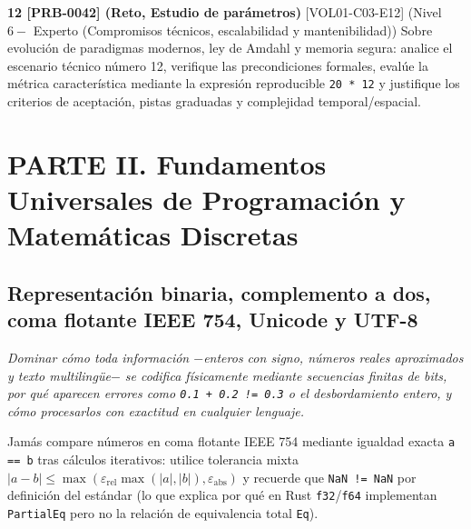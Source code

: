 \documentclass{book}
\begin{document}
\begin{tcolorbox}[title={Ejercicios}, studiumworked, breakable]
\noindent\textbf{12 [PRB-0042] (Reto, Estudio de parámetros)}
[VOL01-C03-E12] (Nivel \(6 -\) Experto (Compromisos técnicos, escalabilidad y mantenibilidad)) Sobre evolución de paradigmas modernos, ley de Amdahl y memoria segura: analice el escenario técnico número 12, verifique las precondiciones formales, evalúe la métrica característica mediante la expresión reproducible \texttt{20 * 12} y justifique los criterios de aceptación, pistas graduadas y complejidad temporal/espacial.
\end{tcolorbox}

\part{PARTE II. Fundamentos Universales de Programación y Matemáticas Discretas}

\chapter{Representación binaria, complemento a dos, coma flotante IEEE 754, Unicode y UTF-8}
\label{chap:cap04-representacion-binaria-ieee754-utf8}

\noindent\textit{Dominar cómo toda información \(-\)enteros con signo, números reales aproximados y texto multilingüe\(-\) se codifica físicamente mediante secuencias finitas de bits, por qué aparecen errores como \texttt{0.1 + 0.2 != 0.3} o el desbordamiento entero, y cómo procesarlos con exactitud en cualquier lenguaje.}

\begin{tcolorbox}[title={Consejo}, studiumtip, breakable]

Jamás compare números en coma flotante IEEE 754 mediante igualdad exacta \texttt{a == b} tras cálculos iterativos: utilice tolerancia mixta \(|a - b| \le \max(\varepsilon_{\text{rel}} \max(|a|, |b|), \varepsilon_{\text{abs}})\) y recuerde que \texttt{NaN != NaN} por definición del estándar (lo que explica por qué en Rust \texttt{f32}/\texttt{f64} implementan \texttt{PartialEq} pero no la relación de equivalencia total \texttt{Eq}).
\end{tcolorbox}
\end{document}

